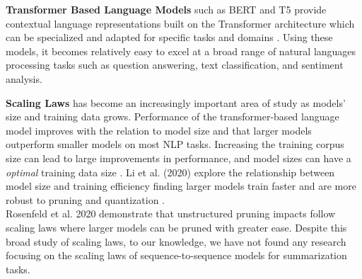 \textbf{Transformer Based Language Models} such as BERT \cite{Devlin2019BERTPO} and T5 \cite{Raffel2020ExploringTL} provide contextual language representations built on the Transformer architecture \cite{Vaswani2017AttentionIA} which can be specialized and adapted for specific tasks and domains \cite{Lee2020BioBERTAP}. Using these models, it becomes relatively easy to excel at a broad range of natural languages processing tasks such as question answering, text classification, and sentiment analysis. \\
\begin{table*}[htb!]
    \centering
    \caption{Information about the architecture and attributes of the FLAN-T5 models}
    \label{tab:models}
\end{table*}
\textbf{Scaling Laws} has become an increasingly important area of study as models' size and training data grows. Performance of the transformer-based language model improves with the relation to model size \cite{Radford2018ImprovingLU} and that larger models outperform smaller models \cite{Brown2020LanguageMA} on most NLP tasks. Increasing the training corpus size can lead to large improvements in performance, and model sizes can have a \textit{optimal} training data size \cite{Hoffmann2022TrainingCL}. Li et al. (2020) \cite{Li2020TrainLT} explore the relationship between model size and training efficiency finding larger models train faster and are more robust to pruning and quantization \cite{Na2022TrainFT}. \\
Rosenfeld et al. 2020 demonstrate that unstructured pruning impacts follow scaling laws \cite{Rosenfeld2020OnTP} where larger models can be pruned with greater ease. Despite this broad study of scaling laws, to our knowledge, we have not found any research focusing on the scaling laws of sequence-to-sequence models for summarization tasks. \\
